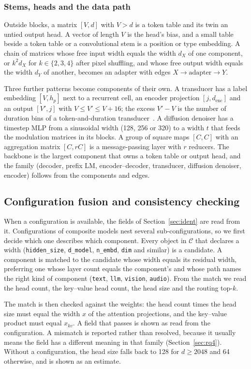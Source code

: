 \documentclass[11pt]{article}
\newcommand{\tn}[1]{\texttt{#1}}
\begin{document}
\subsubsection{Stems, heads and the data path}
Outside blocks, a matrix $[V,d]$ with $V>d$ is a token table and its twin an untied output head. A vector of length $V$ is the head's bias, and a small table beside a token table or a convolutional stem is a position or type embedding. A chain of matrices whose free input width equals the width $d_X$ of one component, or $k^2 d_X$ for $k\in\{2,3,4\}$ after pixel shuffling, and whose free output width equals the width $d_Y$ of another, becomes an adapter with edges $X\to\text{adapter}\to Y$.

Three further patterns become components of their own. A transducer has a label embedding $[V, h_p]$ next to a recurrent cell, an encoder projection $[j, d_{\text{enc}}]$ and an output $[V', j]$ with $V\le V'\le V+16$; the excess $V'-V$ is the number of duration bins of a token-and-duration transducer~\citep{xu2023tdt}. A diffusion denoiser has a timestep MLP from a sinusoidal width (128, 256 or 320) to a width $t$ that feeds the modulation matrices in its blocks. A group of square maps $[C,C]$ with an aggregation matrix $[C, rC]$ is a message-passing layer with $r$ reducers. The backbone is the largest component that owns a token table or output head, and the family (decoder, prefix LM, encoder--decoder, transducer, diffusion denoiser, encoder) follows from the components and edges.

\subsection{Configuration fusion and consistency checking}
\label{sec:fusion}
When a configuration is available, the fields of Section~\ref{sec:ident} are read from it. Configurations of composite models nest several sub-configurations, so we first decide which one describes which component. Every object in $\mathcal{C}$ that declares a width (\tn{hidden\_size}, \tn{d\_model}, \tn{n\_embd}, \tn{dim} and similar) is a candidate. A component is matched to the candidate whose width equals its residual width, preferring one whose layer count equals the component's and whose path names the right kind of component (\tn{text}, \tn{llm}, \tn{vision}, \tn{audio}). From the match we read the head count, the key--value head count, the head size and the routing top-$k$.

The match is then checked against the weights: the head count times the head size must equal the width $x$ of the attention projections, and the key--value product must equal $x_{kv}$. A field that passes is shown as read from the configuration. A mismatch is reported rather than resolved, because it usually means the field has a different meaning in that family (Section~\ref{sec:rq4}). Without a configuration, the head size falls back to 128 for $d\ge2048$ and 64 otherwise, and is shown as an estimate.
\end{document}
